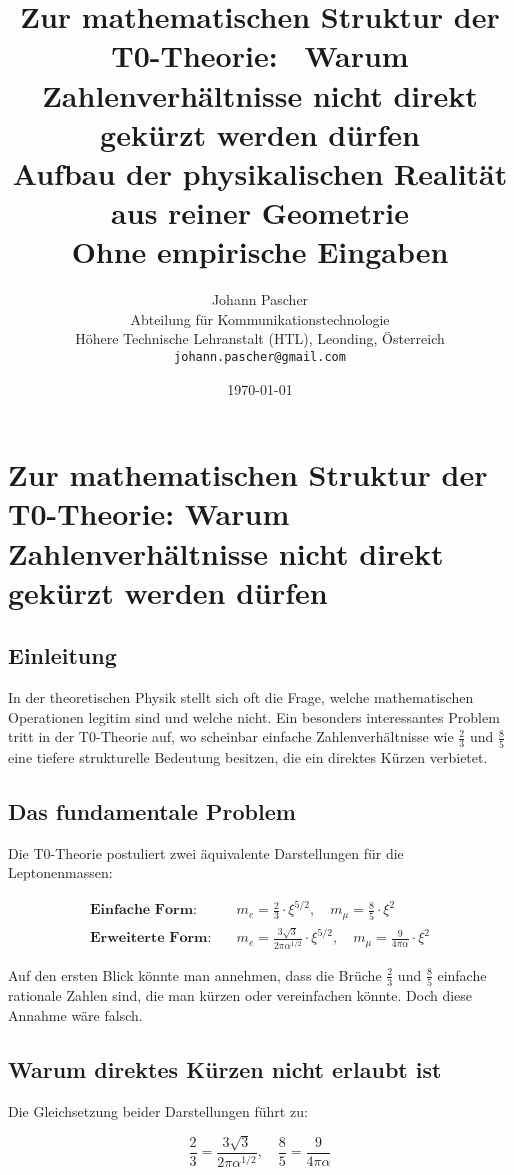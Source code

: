 \documentclass[12pt,a4paper]{article}
\title{\textbf{Zur mathematischen Struktur der T0-Theorie: \ Warum Zahlenverhältnisse nicht direkt gekürzt werden dürfen}\\[0.5cm]
	\large Aufbau der physikalischen Realität aus reiner Geometrie\\[0.3cm]
	\normalsize Ohne empirische Eingaben}
\author{Johann Pascher\\
	Abteilung für Kommunikationstechnologie\\
	Höhere Technische Lehranstalt (HTL), Leonding, Österreich\\
	\texttt{johann.pascher@gmail.com}}
\date{\today}
\begin{document}
	\maketitle
	\tableofcontents
	\newpage	
	\section*{Zur mathematischen Struktur der T0-Theorie: Warum Zahlenverhältnisse nicht direkt gekürzt werden dürfen}
	
	\subsection*{Einleitung}
	
	In der theoretischen Physik stellt sich oft die Frage, welche mathematischen Operationen legitim sind und welche nicht. Ein besonders interessantes Problem tritt in der T0-Theorie auf, wo scheinbar einfache Zahlenverhältnisse wie $\frac{2}{3}$ und $\frac{8}{5}$ eine tiefere strukturelle Bedeutung besitzen, die ein direktes Kürzen verbietet.
	
	\subsection*{Das fundamentale Problem}
	
	Die T0-Theorie postuliert zwei äquivalente Darstellungen für die Leptonenmassen:
	
	\begin{align*}
		\textbf{Einfache Form:} &\quad m_e = \frac{2}{3} \cdot \xi^{5/2}, \quad m_\mu = \frac{8}{5} \cdot \xi^2 \\
		\textbf{Erweiterte Form:} &\quad m_e = \frac{3\sqrt{3}}{2\pi\alpha^{1/2}} \cdot \xi^{5/2}, \quad m_\mu = \frac{9}{4\pi\alpha} \cdot \xi^2
	\end{align*}
	
	Auf den ersten Blick könnte man annehmen, dass die Brüche $\frac{2}{3}$ und $\frac{8}{5}$ einfache rationale Zahlen sind, die man kürzen oder vereinfachen könnte. Doch diese Annahme wäre falsch.
	
	\subsection*{Warum direktes Kürzen nicht erlaubt ist}
	
	Die Gleichsetzung beider Darstellungen führt zu:
	
	\[
	\frac{2}{3} = \frac{3\sqrt{3}}{2\pi\alpha^{1/2}}, \quad \frac{8}{5} = \frac{9}{4\pi\alpha}
	\]
	
\end{document}
